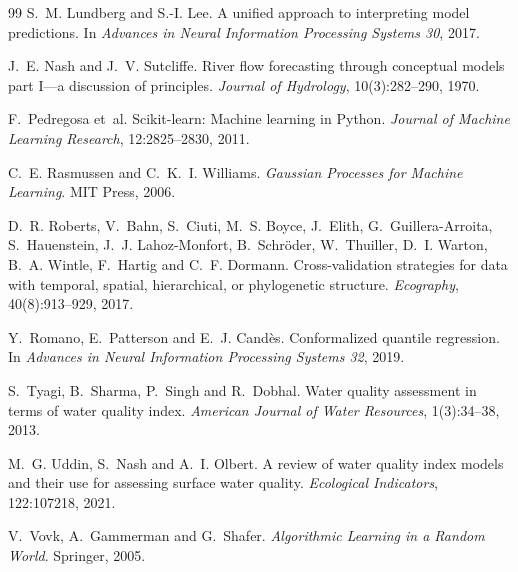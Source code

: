\begin{thebibliography}{99}
S.~M. Lundberg and S.-I. Lee.
\newblock A unified approach to interpreting model predictions.
\newblock In \emph{Advances in Neural Information Processing Systems 30}, 2017.

J.~E. Nash and J.~V. Sutcliffe.
\newblock River flow forecasting through conceptual models part {I}---a discussion of principles.
\newblock \emph{Journal of Hydrology}, 10(3):282--290, 1970.

F.~Pedregosa et~al.
\newblock Scikit-learn: Machine learning in {P}ython.
\newblock \emph{Journal of Machine Learning Research}, 12:2825--2830, 2011.

C.~E. Rasmussen and C.~K.~I. Williams.
\newblock \emph{Gaussian Processes for Machine Learning}.
\newblock MIT Press, 2006.

D.~R. Roberts, V.~Bahn, S.~Ciuti, M.~S. Boyce, J.~Elith, G.~Guillera-Arroita, S.~Hauenstein, J.~J. Lahoz-Monfort, B.~Schr\"oder, W.~Thuiller, D.~I. Warton, B.~A. Wintle, F.~Hartig and C.~F. Dormann.
\newblock Cross-validation strategies for data with temporal, spatial, hierarchical, or phylogenetic structure.
\newblock \emph{Ecography}, 40(8):913--929, 2017.

Y.~Romano, E.~Patterson and E.~J. Cand\`es.
\newblock Conformalized quantile regression.
\newblock In \emph{Advances in Neural Information Processing Systems 32}, 2019.

S.~Tyagi, B.~Sharma, P.~Singh and R.~Dobhal.
\newblock Water quality assessment in terms of water quality index.
\newblock \emph{American Journal of Water Resources}, 1(3):34--38, 2013.

M.~G. Uddin, S.~Nash and A.~I. Olbert.
\newblock A review of water quality index models and their use for assessing surface water quality.
\newblock \emph{Ecological Indicators}, 122:107218, 2021.

V.~Vovk, A.~Gammerman and G.~Shafer.
\newblock \emph{Algorithmic Learning in a Random World}.
\newblock Springer, 2005.

\end{thebibliography}
